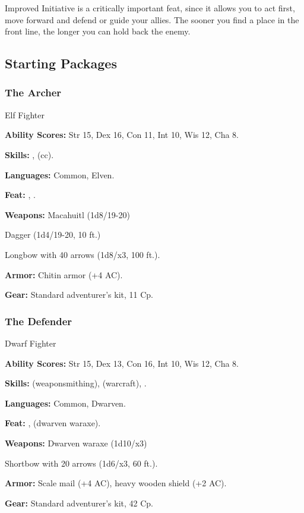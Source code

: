 Improved Initiative is a critically important feat, since it allows you to act first, move forward and defend or guide your allies. The sooner you find a place in the front line, the longer you can hold back the enemy.

\subsection{Starting Packages}

\subsubsection{The Archer}

Elf Fighter

\textbf{Ability Scores:} Str 15, Dex 16, Con 11, Int 10, Wis 12, Cha 8.

\textbf{Skills:} ,  (cc).

\textbf{Languages:} Common, Elven.

\textbf{Feat:} , .

\textbf{Weapons:} Macahuitl (1d8/19-20)

Dagger (1d4/19-20, 10 ft.)

Longbow with 40 arrows (1d8/x3, 100 ft.).

\textbf{Armor:} Chitin armor (+4 AC).

\textbf{Gear:} Standard adventurer's kit, 11 Cp.

\subsubsection{The Defender}

Dwarf Fighter

\textbf{Ability Scores:} Str 15, Dex 13, Con 16, Int 10, Wis 12, Cha 8.

\textbf{Skills:}  (weaponsmithing),  (warcraft), .

\textbf{Languages:} Common, Dwarven.

\textbf{Feat:} ,  (dwarven waraxe).

\textbf{Weapons:} Dwarven waraxe (1d10/x3)

Shortbow with 20 arrows (1d6/x3, 60 ft.).

\textbf{Armor:} Scale mail (+4 AC), heavy wooden shield (+2 AC).

\textbf{Gear:} Standard adventurer's kit, 42 Cp.


